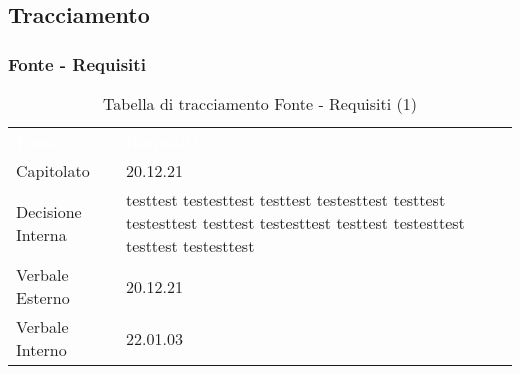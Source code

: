 \subsection{Tracciamento}

\subsubsection{Fonte - Requisiti}


\begin{table}[!htbp]
\renewcommand{\arraystretch}{1.5}
\begin{tabular}{ m{}<{\centering}  m{}<{\centering} }
	\rowcolor{darkblue}
	\textcolor{white}{\textbf{Fonte}} &\textcolor{white}{\textbf{Requisiti}}\\ 

	Capitolato & 20.12.21\\	

	\rowcolor{gray!10} Decisione Interna & testtest testesttest testtest testesttest testtest testesttest testtest testesttest testtest testesttest testtest testesttest\\
	
	Verbale Esterno & 20.12.21\\
	
	\rowcolor{gray!10} Verbale Interno & 22.01.03 \\

\end{tabular}
\caption{Tabella di tracciamento Fonte - Requisiti (1)}
\end{table}


